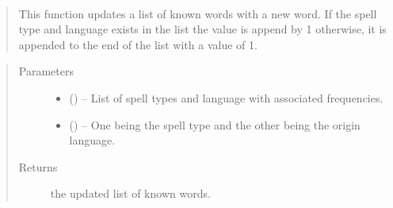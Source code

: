 \documentclass[letterpaper,10pt,english]{sphinxmanual}
\begin{document}

\begin{fulllineitems}
\label{code:hp_spells.checkStoredWords}~\begin{quote}

This function updates a list of known words with a new word. If the spell type and language exists in the list the value is append by 1 otherwise, it is appended to the end of the list with a value of 1.
\end{quote}
\begin{quote}\begin{description}
\item[{Parameters}] \leavevmode\begin{itemize}
\item {} 
 (\sphinxstyleliteralemphasis{}\sphinxstyleliteralemphasis{{[}}\sphinxstyleliteralemphasis{}\sphinxstyleliteralemphasis{{[}}\sphinxstyleliteralemphasis{}\sphinxstyleliteralemphasis{{[}}\sphinxstyleliteralemphasis{, }\sphinxstyleliteralemphasis{{]}}\sphinxstyleliteralemphasis{}\sphinxstyleliteralemphasis{, }\sphinxstyleliteralemphasis{{]}}\sphinxstyleliteralemphasis{{]}}\sphinxstyleliteralemphasis{}) -- List of spell types and language with associated frequencies.

\item {} 
 () -- One being the spell type and the other being the origin language.

\end{itemize}

\item[{Returns}] \leavevmode
the updated list of known words.

\end{description}\end{quote}

\end{fulllineitems}

\end{document}
